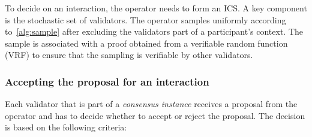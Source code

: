 

To decide on an interaction, the operator needs to form an ICS. A key component is the stochastic set of validators. The operator samples uniformly according to~\cref{alg:sample} after excluding the validators part of a participant's context. The sample is associated with a proof obtained from a verifiable random function (VRF) to ensure that the sampling is verifiable by other validators.





\subsubsection{Accepting the proposal for an interaction}\label{validpropose}

Each validator that is part of a \emph{consensus instance} receives a proposal from the operator and has to decide whether to accept or reject the proposal. 
The decision is based on the following criteria:

